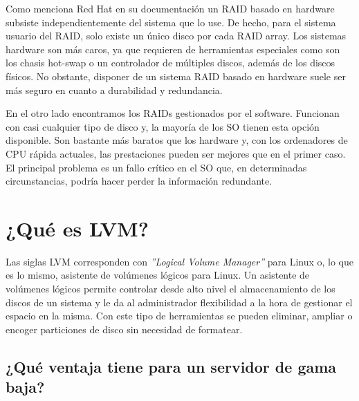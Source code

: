 Como menciona Red Hat en su documentación\cite{raids} un RAID basado en hardware subsiste independientemente del sistema que lo use.
De hecho, para el sistema usuario del RAID, solo existe un único disco por cada RAID array.
Los sistemas hardware son más caros, ya que requieren de herramientas especiales como son los chasis hot-swap o un controlador de múltiples discos,
además de los discos físicos. No obstante, disponer de un sistema RAID basado en hardware suele ser más seguro en cuanto a durabilidad y redundancia.

\vspace{8mm}

En el otro lado encontramos los RAIDs gestionados por el software. Funcionan con casi cualquier tipo de disco y, la mayoría de 
los SO tienen esta opción disponible. Son bastante más baratos que los hardware y, con los ordenadores de CPU rápida actuales,
las prestaciones pueden ser mejores que en el primer caso. El principal problema es un fallo crítico en el SO que, en determinadas circunstancias, podría hacer perder 
la información redundante.







\section{¿Qué es LVM?}
Las siglas LVM corresponden con \textit{''Logical Volume Manager''} para Linux o, lo que es lo mismo, asistente de volúmenes lógicos para Linux\cite{lvm}.
Un asistente de volúmenes lógicos permite controlar desde alto nivel el almacenamiento de los discos de un sistema y le da al administrador flexibilidad
a la hora de gestionar el espacio en la misma. Con este tipo de herramientas se pueden eliminar, ampliar o encoger particiones de disco 
sin necesidad de formatear. 

\vspace{6mm}

\subsection{¿Qué ventaja tiene para un servidor de gama baja?}

